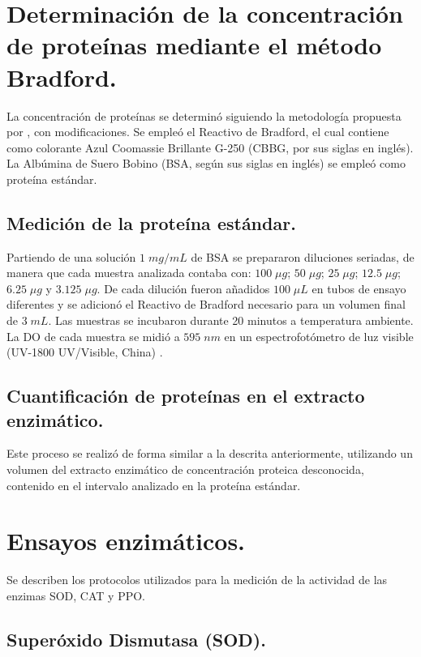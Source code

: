 \section{Determinaci\'on de la concentración de proteínas mediante el m\'etodo Bradford.}

La concentraci\'on de prote\'inas se determin\'o siguiendo la metodolog\'ia propuesta por \cite{bradford1976rapid}, con modificaciones. Se emple\'o el Reactivo de Bradford, el cual contiene como colorante Azul Coomassie Brillante G-250 (CBBG, por sus siglas en inglés). La Alb\'umina de Suero Bobino (BSA, según sus siglas en inglés) se emple\'o como prote\'ina est\'andar.  

\subsection {Medición de la proteína estándar.}

Partiendo de una soluci\'on $1\;mg/mL$ de BSA se prepararon diluciones seriadas, de manera que cada muestra analizada contaba con: $100\;\mu g$; $50\;\mu g$; $25\;\mu g$; $12.5\;\mu g$; $6.25\;\mu g$ y $3.125\;\mu g$. De cada diluci\'on fueron a\~nadidos $100 \;\mu L$ en tubos de ensayo diferentes y se adicion\'o el Reactivo de Bradford necesario para un volumen final de $3 \; mL$. Las muestras se incubaron durante 20 minutos a temperatura ambiente. La DO de cada muestra se midi\'o a $595 \;nm$ en un espectrofotómetro de luz visible (UV-1800 UV/Visible, China) \citep{kruger2009bradford}.

\subsection {Cuantificación de proteínas en el extracto enzim\'atico.}

Este proceso se realiz\'o de forma similar a la descrita anteriormente, utilizando un volumen del extracto enzim\'atico de concentraci\'on proteica desconocida, contenido en el intervalo analizado en la prote\'ina est\'andar. 

\section{Ensayos enzimáticos.} 

Se describen los protocolos utilizados para la medici\'on de la actividad de las enzimas SOD, CAT y PPO.

\subsection{Super\'oxido Dismutasa (SOD).}

